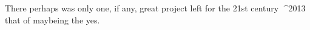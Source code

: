 There perhaps was only one, if any, great project left for the 21st
century ^^^^2013 that of \mbox{maybeing} the yes.

